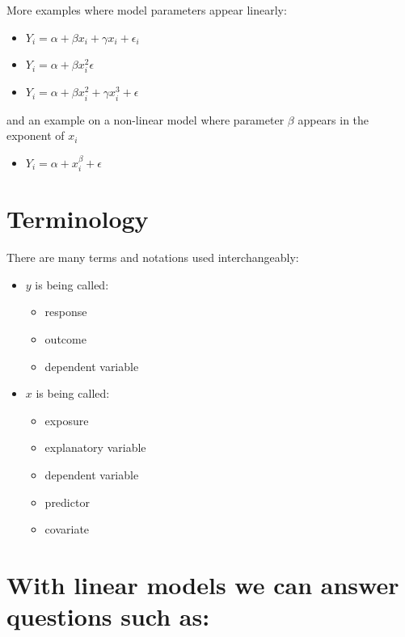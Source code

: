 \documentclass[
]{book}
\providecommand{\tightlist}{%
  \setlength{\itemsep}{0pt}\setlength{\parskip}{0pt}}
\theoremstyle{definition}
\theoremstyle{definition}
\theoremstyle{definition}
\theoremstyle{remark}
\begin{document}
More examples where model parameters appear linearly:

\begin{itemize}
\tightlist
\item
  \(Y_i = \alpha + \beta x_i + \gamma x_i + \epsilon_i\)
\item
  \(Y_i = \alpha + \beta x_i^2 \epsilon\)
\item
  \(Y_i = \alpha + \beta x_i^2 + \gamma x_i^3 + \epsilon\)
\end{itemize}

and an example on a non-linear model where parameter \(\beta\) appears in the exponent of \(x_i\)

\begin{itemize}
\tightlist
\item
  \(Y_i = \alpha + x_i^\beta + \epsilon\)
\end{itemize}

\hypertarget{terminology}{%
\section{Terminology}\label{terminology}}

There are many terms and notations used interchangeably:

\begin{itemize}
\tightlist
\item
  \(y\) is being called:

  \begin{itemize}
  \tightlist
  \item
    response
  \item
    outcome
  \item
    dependent variable
  \end{itemize}
\item
  \(x\) is being called:

  \begin{itemize}
  \tightlist
  \item
    exposure
  \item
    explanatory variable
  \item
    dependent variable
  \item
    predictor
  \item
    covariate
  \end{itemize}
\end{itemize}

\hypertarget{with-linear-models-we-can-answer-questions-such-as}{%
\section{With linear models we can answer questions such as:}\label{with-linear-models-we-can-answer-questions-such-as}}
\end{document}
